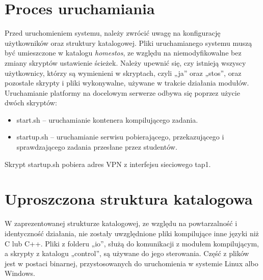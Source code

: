 \section{Proces uruchamiania}
Przed uruchomieniem systemu, należy zwrócić uwagę na konfigurację użytkowników oraz struktury katalogowej. Pliki uruchamianego systemu muszą być umieszczone w katalogu \textit{\/home\/stos}, ze względu na niemodyfikowalne bez zmiany skryptów ustawienie ścieżek. Należy upewnić się, czy istnieją wszyscy użytkownicy, którzy są wymienieni w skryptach, czyli „ja” oraz „stos”, oraz pozostałe skrypty i pliki wykonywalne, używane w trakcie działania modułów.
\newline \indent Uruchamianie platformy na docelowym serwerze odbywa się poprzez użycie dwóch skryptów:
\begin{itemize}
    \item start.sh -- uruchamianie kontenera kompilującego zadania.
    \item startup.sh -- uruchamianie serwisu pobierającego, przekazującego i sprawdzającego zadania przesłane przez studentów.
\end{itemize}
Skrypt startup.sh pobiera adres VPN z interfejsu sieciowego tap1. 

\section{Uproszczona struktura katalogowa}
W zaprezentowanej strukturze katalogowej, ze względu na powtarzalność i identyczność działania, nie zostały uwzględnione pliki kompilujące inne języki niż C lub C++. Pliki z folderu „io”, służą do komunikacji z modułem kompilującym, a skrypty z katalogu „control”, są używane do jego sterowania. Część z plików jest w postaci binarnej, przystosowanych do uruchomienia w systemie Linux albo Windows.